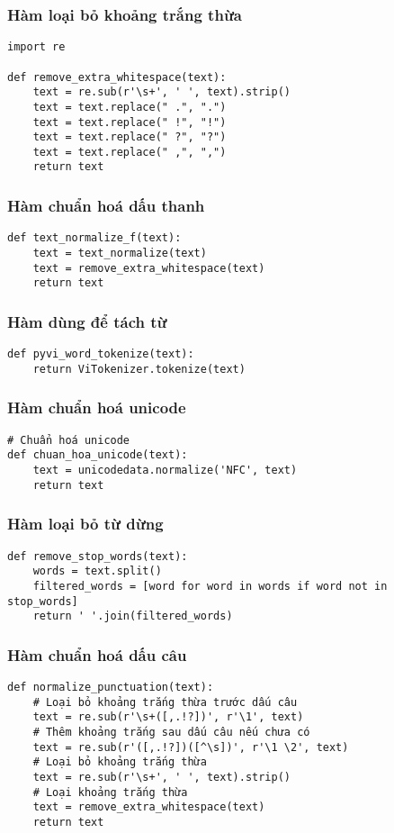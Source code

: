 \subsubsection{Hàm loại bỏ khoảng trắng thừa}
\begin{verbatim}
import re

def remove_extra_whitespace(text):
    text = re.sub(r'\s+', ' ', text).strip()
    text = text.replace(" .", ".")
    text = text.replace(" !", "!")
    text = text.replace(" ?", "?")
    text = text.replace(" ,", ",")
    return text
\end{verbatim}

\subsubsection{Hàm chuẩn hoá dấu thanh}

\begin{verbatim}
def text_normalize_f(text):
    text = text_normalize(text)
    text = remove_extra_whitespace(text)
    return text
\end{verbatim}
\subsubsection{Hàm dùng để tách từ}

\begin{verbatim}
def pyvi_word_tokenize(text):
    return ViTokenizer.tokenize(text)
\end{verbatim}

\subsubsection{Hàm chuẩn hoá unicode}


\begin{verbatim}
# Chuẩn hoá unicode
def chuan_hoa_unicode(text):
    text = unicodedata.normalize('NFC', text)
    return text
\end{verbatim}
\subsubsection{Hàm loại bỏ từ dừng}

\begin{verbatim}
def remove_stop_words(text):
    words = text.split()
    filtered_words = [word for word in words if word not in stop_words]
    return ' '.join(filtered_words)
\end{verbatim}
\subsubsection{Hàm chuẩn hoá dấu câu}
\begin{verbatim}
def normalize_punctuation(text):
    # Loại bỏ khoảng trắng thừa trước dấu câu
    text = re.sub(r'\s+([,.!?])', r'\1', text)
    # Thêm khoảng trắng sau dấu câu nếu chưa có
    text = re.sub(r'([,.!?])([^\s])', r'\1 \2', text)
    # Loại bỏ khoảng trắng thừa
    text = re.sub(r'\s+', ' ', text).strip()
    # Loại khoảng trắng thừa
    text = remove_extra_whitespace(text)
    return text
\end{verbatim}

